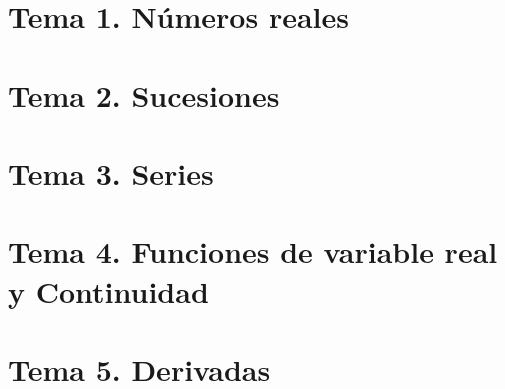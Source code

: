 \documentclass[12pt]{report} %
\begin{document}


\clearpage
{} %



\part{Tema 1. Números reales}







\part{Tema 2. Sucesiones}





\part{Tema 3. Series}





\part{Tema 4. Funciones de variable real y Continuidad}









\part{Tema 5. Derivadas}









\end{document}
